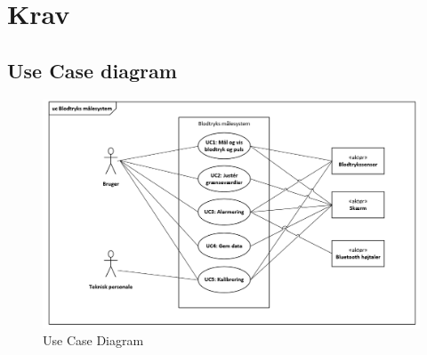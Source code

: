 \chapter{Krav}


\section{Use Case diagram}
	\vspace{0.4 cm}
	
\begin{figure}[h!]
	\centering
	\includegraphics[width=0.75\linewidth]{Kravspecifikation/Diagram}
	\caption{Use Case Diagram}
	\label{fig:Use_Case_Diagram}
\end{figure}

\vspace{0.8 cm}



\clearpage




